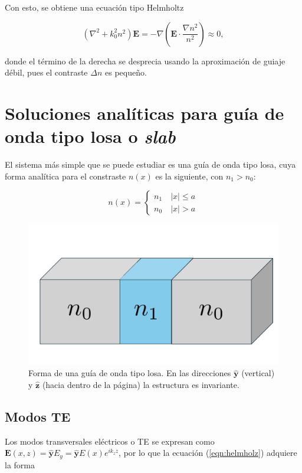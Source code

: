 Con esto, se obtiene una ecuación tipo Helmholtz 

\begin{equation}
	(\nabla^2  + k_0^2n^2)\textbf{E} = -\nabla\left(\textbf{E} \cdot \frac{\nabla n^2}{n^2}\right) \approx 0, \label{eqn:helmholz}
\end{equation}

donde el término de la derecha se desprecia usando la aproximación de guiaje débil, pues el contraste $\Delta n$ es pequeño. 

\section{Soluciones analíticas para guía de onda tipo losa o \textit{slab}}

El sistema más simple que se puede estudiar es una guía de onda tipo losa, cuya forma analítica para el constraste $n(x)$ es la siguiente, con $n_1 > n_0$:

\begin{equation*}
	n(x) = \left\{\begin{matrix}
	n_1 \quad |x| \le a
	\\
	n_0 \quad |x| > a
 	\end{matrix}\right.
\end{equation*}

\begin{figure}[H]
	\centering
	\includegraphics[width=0.6\linewidth]{media/slab.pdf}
	\caption[Forma de una guía de onda tipo losa.]{Forma de una guía de onda tipo losa. En las direcciones $\mathbf{\hat{y}}$ (vertical) y $\mathbf{\hat{z}}$ (hacia dentro de la página) la estructura es invariante.}
\end{figure}
\subsection{Modos TE}

Los modos transversales eléctricos o TE se expresan como $\textbf{E}(x,z) =\mathbf{\hat{y}} E_y= \mathbf{\hat{y}} E(x)e^{i k_z z }$, por lo que la ecuación (\ref{eqn:helmholz}) adquiere la forma

